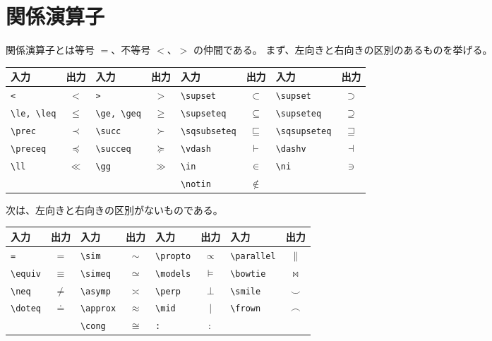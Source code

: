 \section{関係演算子}
関係演算子とは等号 $=$、不等号 $<$、$>$ の仲間である。
まず、左向きと右向きの区別のあるものを挙げる。
\begin{longtable}{@{}lclclclc@{}}
    入力             & 出力      & 入力             & 出力      & 入力               & 出力          & 入力               & 出力          \\ \toprule
    \verb`<`         & $<$       & \verb`>`         & $>$       & \verb`\supset`     & $\subset$     & \verb`\supset`     & $\supset$     \\
    \verb`\le, \leq` & $\le$     & \verb`\ge, \geq` & $\ge$     & \verb`\supseteq`   & $\subseteq$   & \verb`\supseteq`   & $\supseteq$   \\
    \verb`\prec`     & $\prec$   & \verb`\succ`     & $\succ$   & \verb`\sqsubseteq` & $\sqsubseteq$ & \verb`\sqsupseteq` & $\sqsupseteq$ \\
    \verb`\preceq`   & $\preceq$ & \verb`\succeq`   & $\succeq$ & \verb`\vdash`      & $\vdash$      & \verb`\dashv`      & $\dashv$      \\
    \verb`\ll`       & $\ll$     & \verb`\gg`       & $\gg$     & \verb`\in`         & $\in$         & \verb`\ni`         & $\ni$         \\
    \                &           &                  &           & \verb`\notin`      & $\notin$      &                    &               \\
\end{longtable}
次は、左向きと右向きの区別がないものである。
\begin{longtable}{@{}lclclclc@{}}
    入力          & 出力     & 入力           & 出力      & 入力           & 出力      & 入力             & 出力        \\ \toprule
    \verb`=`      & $=$      & \verb`\sim`    & $\sim$    & \verb`\propto` & $\propto$ & \verb`\parallel` & $\parallel$ \\
    \verb`\equiv` & $\equiv$ & \verb`\simeq`  & $\simeq$  & \verb`\models` & $\models$ & \verb`\bowtie`   & $\bowtie$   \\
    \verb`\neq`   & $\neq$   & \verb`\asymp`  & $\asymp$  & \verb`\perp`   & $\perp$   & \verb`\smile`    & $\smile$    \\
    \verb`\doteq` & $\doteq$ & \verb`\approx` & $\approx$ & \verb`\mid`    & $\mid$    & \verb`\frown`    & $\frown$    \\
    \             &          & \verb`\cong`   & $\cong$   & \verb`:`       & $:$       &                  &             \\
\end{longtable}
